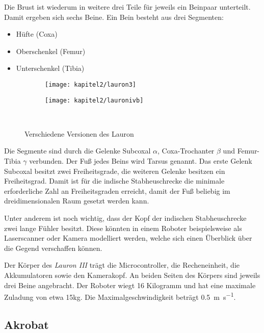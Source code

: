Die Brust ist wiederum in weitere drei Teile für jeweils ein Beinpaar unterteilt. Damit ergeben sich sechs Beine. Ein Bein besteht aus drei Segmenten:
\begin{itemize}
  \item Hüfte (Coxa)
  \item Oberschenkel (Femur)
  \item Unterschenkel (Tibia)
\end{itemize}

\begin{figure}[b!]
  \centering
  \begin{subfigure}[b]{.4\linewidth}
    \centering
    \texttt{[image: kapitel2/lauron3]}
    \label{kap2:lauron3}
  \end{subfigure}%
  \qquad
  \begin{subfigure}[b]{.4\linewidth}
    \centering
    \texttt{[image: kapitel2/lauronivb]}
    \label{kap2:lauron4b}
  \end{subfigure}\\
  \caption{Verschiedene Versionen des Lauron}
  \label{kap2lauron}
\end{figure}

Die Segmente sind durch die Gelenke Subcoxal $\alpha$, Coxa-Trochanter $\beta$ und Femur-Tibia $\gamma$ verbunden. Der Fuß jedes Beins wird Tarsus genannt. Das erste Gelenk Subcoxal besitzt zwei Freiheitsgrade, die weiteren Gelenke besitzen ein Freiheitsgrad. Damit ist für die indische Stabheuschrecke die minimale erforderliche Zahl an Freiheitsgraden erreicht, damit der Fuß beliebig im dreidimensionalen Raum gesetzt werden kann.

Unter anderem ist noch wichtig, dass der Kopf der indischen Stabheuschrecke zwei lange Fühler besitzt. Diese könnten in einem Roboter beispielsweise als Laserscanner oder Kamera modelliert werden, welche sich einen Überblick über die Gegend verschaffen können.

Der Körper des \emph{Lauron III} trägt die Microcontroller, die Recheneinheit, die Akkumulatoren sowie den Kamerakopf. An beiden Seiten des Körpers sind jeweils drei Beine angebracht. Der Roboter wiegt 16 Kilogramm und hat eine maximale Zuladung von etwa 15kg. Die Maximalgeschwindigkeit beträgt \SI{0.5}{\metre\per\second}. \autocite{gassmann2000} \autocite{troilo2007}

\subsection{Akrobat}

